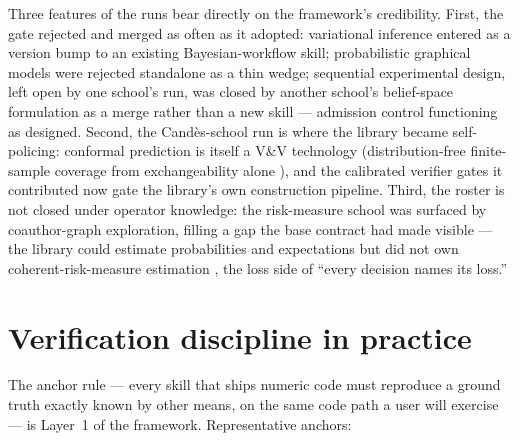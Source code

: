 \documentclass[11pt,a4paper]{article}
\begin{document}
Three features of the runs bear directly on the framework's credibility.
First, the gate rejected and merged as often as it adopted: variational
inference entered as a version bump to an existing Bayesian-workflow
skill; probabilistic graphical models were rejected standalone as a thin
wedge; sequential experimental design, left open by one school's run, was
closed by another school's belief-space formulation as a merge rather than
a new skill --- admission control functioning as designed. Second, the
Cand\`es-school run is where the library became self-policing: conformal
prediction is itself a V\&V technology (distribution-free finite-sample
coverage from exchangeability alone \citep{vovk2005,lei2018}), and the
calibrated verifier gates it contributed now gate the library's own
construction pipeline. Third, the roster is not closed under operator
knowledge: the risk-measure school was surfaced by coauthor-graph
exploration, filling a gap the base contract had made visible --- the
library could estimate probabilities and expectations but did not own
coherent-risk-measure estimation \citep{rockafellar2000,giles2019}, the
loss side of ``every decision names its loss.''

\section{Verification discipline in practice}\label{sec:verify}

The anchor rule --- every skill that ships numeric code must reproduce a
ground truth exactly known by other means, on the same code path a user
will exercise --- is Layer~1 of the framework. Representative anchors:
\end{document}
